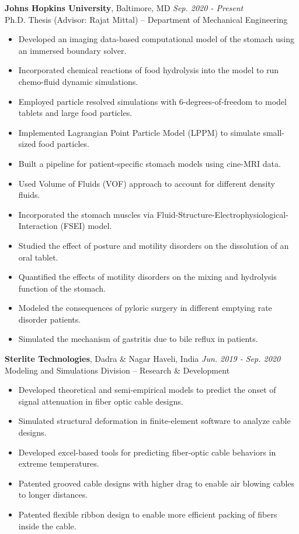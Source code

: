 \documentclass[11pt]{article}
\begin{document}
\noindent\textbf{Johns Hopkins University}, Baltimore, MD \hfill \textit{Sep. 2020 - Present} \\
Ph.D. Thesis (Advisor: Rajat Mittal) – Department of Mechanical Engineering
\begin{itemize}[leftmargin=*,itemsep=1pt]
    \item Developed an imaging data-based computational model of the stomach using an immersed boundary solver.
    \item Incorporated chemical reactions of food hydrolysis into the model to run chemo-fluid dynamic simulations.
    \item Employed particle resolved simulations with 6-degrees-of-freedom to model tablets and large food particles.
    \item Implemented Lagrangian Point Particle Model (LPPM) to simulate small-sized food particles.
    \item Built a pipeline for patient-specific stomach models using cine-MRI data.
    \item Used Volume of Fluids (VOF) approach to account for different density fluids.
    \item Incorporated the stomach muscles via Fluid-Structure-Electrophysiological-Interaction (FSEI) model.
    \item Studied the effect of posture and motility disorders on the dissolution of an oral tablet.
    \item Quantified the effects of motility disorders on the mixing and hydrolysis function of the stomach.
    \item Modeled the consequences of pyloric surgery in different emptying rate disorder patients.
    \item Simulated the mechanism of gastritis due to bile reflux in patients.
\end{itemize}

\vspace{4mm}

\noindent\textbf{Sterlite Technologies}, Dadra \& Nagar Haveli, India \hfill \textit{Jun. 2019 - Sep. 2020} \\
Modeling and Simulations Division – Research \& Development
\begin{itemize}[leftmargin=*,itemsep=1pt]
    \item Developed theoretical and semi-empirical models to predict the onset of signal attenuation in fiber optic cable designs.
    \item Simulated structural deformation in finite-element software to analyze cable designs.
    \item Developed excel-based tools for predicting fiber-optic cable behaviors in extreme temperatures.
    \item Patented grooved cable designs with higher drag to enable air blowing cables to longer distances.
    \item Patented flexible ribbon design to enable more efficient packing of fibers inside the cable.
\end{itemize}
\end{document}
